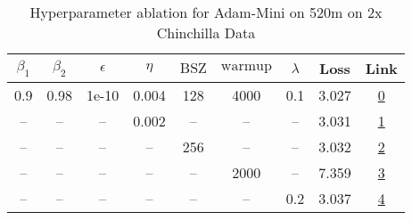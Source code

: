 \begin{table}[H]
\centering
\caption{Hyperparameter ablation for Adam-Mini on 520m on 2x Chinchilla Data}
\label{tab:ablation_adam-mini_520m_2}
\begin{tabular}{ccccccccc}
\toprule
$\beta_1$ & $\beta_2$ & $\epsilon$ & $\eta$ & $\mathrm{BSZ}$ & $\mathrm{warmup}$ & $\lambda$ & Loss & Link \\
\midrule
0.9 & 0.98 & 1e-10 & 0.004 & 128 & 4000 & 0.1 & 3.027 & \href{https://wandb.ai/stanford-mercury/optimizer-scaling/runs/sweep-520m-21B-mini4e584elr0.004-wd0.1-minlr0-warmup4000-b10.9-b-eceb71}{0} \\
\midrule
-- & -- & -- & 0.002 & -- & -- & -- & 3.031 & \href{https://wandb.ai/stanford-mercury/optimizer-scaling/runs/sweep-520m-21B-mini3dba17lr0.002-wd0.1-minlr0-warmup4000-b10.9-b-557d40}{1} \\
-- & -- & -- & -- & 256 & -- & -- & 3.032 & \href{https://wandb.ai/stanford-mercury/optimizer-scaling/runs/sweep-520m-21B-mini89512clr0.004-wd0.1-minlr0-warmup4000-b10.9-b-66cd27}{2} \\
-- & -- & -- & -- & -- & 2000 & -- & 7.359 & \href{https://wandb.ai/stanford-mercury/optimizer-scaling/runs/sweep-520m-21B-mini5c5f85lr0.004-wd0.1-minlr0-warmup2000-b10.9-b-9ff993}{3} \\
-- & -- & -- & -- & -- & -- & 0.2 & 3.037 & \href{https://wandb.ai/stanford-mercury/optimizer-scaling/runs/sweep-520m-21B-miniqbb0854lr0.004-wd0.2-minlr0-warmup4000-b10.9--8a1042}{4} \\
\bottomrule
\end{tabular}
\end{table}

